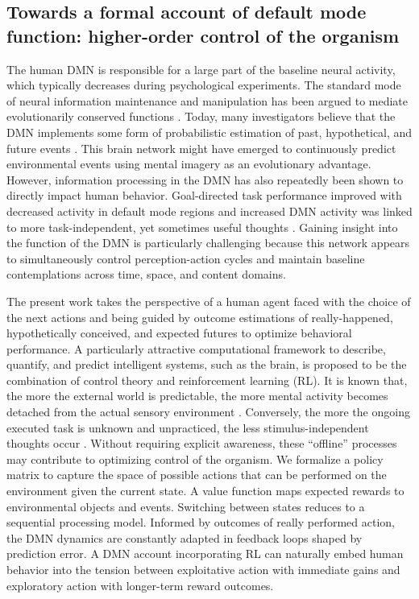 \documentclass[10pt,letterpaper]{article}
\begin{document}
\subsection{Towards a formal account of default mode function: higher-order control of the organism}
The human DMN is responsible for a large part of the baseline neural activity,
which typically decreases during psychological experiments.
The standard mode of
neural information maintenance and manipulation has
been argued to mediate evolutionarily conserved functions
\citep{brown1914nature, binder1999conceptual, buzsaki2006rhythms}.
Today, many investigators believe that the DMN implements some form of
probabilistic estimation of past, hypothetical, and
future events
\citep{fox2005, hassabis2007patients, schacter2007remembering, binder2009,
randy2008}.
This brain network
might have emerged to continuously predict environmental events using
mental imagery as an evolutionary advantage.
%
However, information processing in the DMN has also repeatedly
been shown to directly impact human behavior. Goal-directed task performance
improved with decreased activity in default mode regions \citep{weiss2006}
and increased DMN activity was linked to more task-independent,
yet sometimes useful thoughts
\citep{mason2007, seli2016mind}.
%
Gaining insight into the function of the DMN is
particularly challenging because
this network appears to
simultaneously control perception-action cycles and
maintain baseline contemplations
across time, space, and content domains.


The present work takes the perspective of
a human agent faced with the choice of the next actions
and being guided by outcome estimations
of really-happened, hypothetically conceived, and
expected futures to optimize behavioral performance.
A particularly attractive computational framework
to describe, quantify, and predict intelligent systems, such as the brain,
is proposed to be the combination of control theory and
reinforcement learning (RL).
It is known that, the more the external world is predictable,
the more mental activity becomes detached from the actual sensory environment
\citep{antrobus1966studies, pope1978regulation}.
Conversely,
the more the ongoing executed task is unknown and unpracticed,
the less stimulus-independent thoughts occur
\citep{filler1973daydreaming, teasdale1995stimulus, christoff2016mind}.
Without requiring explicit awareness,
these ``offline'' processes may contribute
to optimizing control of the organism.
We formalize
a policy matrix to capture the space of possible actions that can be performed
on the environment given the current state. A value function
maps expected rewards to environmental objects and events.
Switching between states reduces to a sequential processing model.
Informed by outcomes of really performed action,
the DMN dynamics are constantly adapted in feedback loops
shaped by prediction error.
A DMN account incorporating RL can naturally embed human behavior
into the tension between exploitative action with immediate gains and
exploratory action with longer-term reward outcomes.
\end{document}
